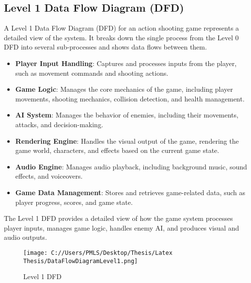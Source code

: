 \subsection{Level 1 Data Flow Diagram (DFD)}
A Level 1 Data Flow Diagram (DFD) for an action shooting game represents a detailed view of the system. It breaks down the single process from the Level 0 DFD into several sub-processes and shows data flows between them.
\begin{itemize}
	\item \textbf{Player Input Handling}: Captures and processes inputs from the player, such as movement commands and shooting actions.
	\item \textbf{Game Logic}: Manages the core mechanics of the game, including player movements, shooting mechanics, collision detection, and health management.
	\item \textbf{AI System}: Manages the behavior of enemies, including their movements, attacks, and decision-making.
	\item \textbf{Rendering Engine}: Handles the visual output of the game, rendering the game world, characters, and effects based on the current game state.
	\item \textbf{Audio Engine}: Manages audio playback, including background music, sound effects, and voiceovers.
	\item \textbf{Game Data Management}: Stores and retrieves game-related data, such as player progress, scores, and game state.
\end{itemize}

The Level 1 DFD provides a detailed view of how the game system processes player inputs, manages game logic, handles enemy AI, and produces visual and audio outputs.

\begin{figure}[H]
	\centering
	\texttt{[image: C://Users/PMLS/Desktop/Thesis/Latex Thesis/DataFlowDiagramLevel1.png]}
	\caption{Level 1 DFD}
	\label{fig:Level 1 Data Flow Diagram}
\end{figure}


